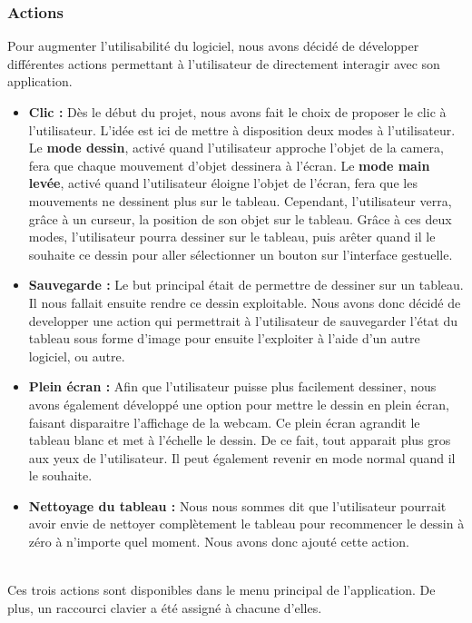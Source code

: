 \documentclass{report}
\begin{document}
			\subsubsection{Actions}
				Pour augmenter l'utilisabilité du logiciel, nous avons décidé de développer différentes actions permettant à l'utilisateur de directement interagir avec son application. \\
				\begin{itemize}
					\item \textbf{Clic :} Dès le début du projet, nous avons fait le choix de proposer le clic à l'utilisateur. L'idée est ici de mettre à disposition deux modes à l'utilisateur. Le \textbf{mode dessin}, activé quand l'utilisateur approche l'objet de la camera, fera que chaque mouvement d'objet dessinera à l'écran. Le \textbf{mode main levée}, activé quand l'utilisateur éloigne l'objet de l'écran, fera que les mouvements ne dessinent plus sur le tableau. Cependant, l'utilisateur verra, grâce à un curseur, la position de son objet sur le tableau. Grâce à ces deux modes, l'utilisateur pourra dessiner sur le tableau, puis arêter quand il le souhaite ce dessin pour aller sélectionner un bouton sur l'interface gestuelle.
					\item \textbf{Sauvegarde : } Le but principal était de permettre de dessiner sur un tableau. Il nous fallait ensuite rendre ce dessin exploitable. Nous avons donc décidé de developper une action qui permettrait à l'utilisateur de sauvegarder l'état du tableau sous forme d'image pour ensuite l'exploiter à l'aide d'un autre logiciel, ou autre.
					\item \textbf{Plein écran : } Afin que l'utilisateur puisse plus facilement dessiner, nous avons également développé une option pour mettre le dessin en plein écran, faisant disparaitre l'affichage de la webcam. Ce plein écran agrandit le tableau blanc et met à l'échelle le dessin. De ce fait, tout apparait plus gros aux yeux de l'utilisateur. Il peut également revenir en mode normal quand il le souhaite.
					
					\item \textbf{Nettoyage du tableau :} Nous nous sommes dit que l'utilisateur pourrait avoir envie de nettoyer complètement le tableau pour recommencer le dessin à zéro à n'importe quel moment. Nous avons donc ajouté cette action.
				\end{itemize}
				
				\ \\Ces trois actions sont disponibles dans le menu principal de l'application. De plus, un raccourci clavier a été assigné à chacune d'elles. \\
\end{document}
